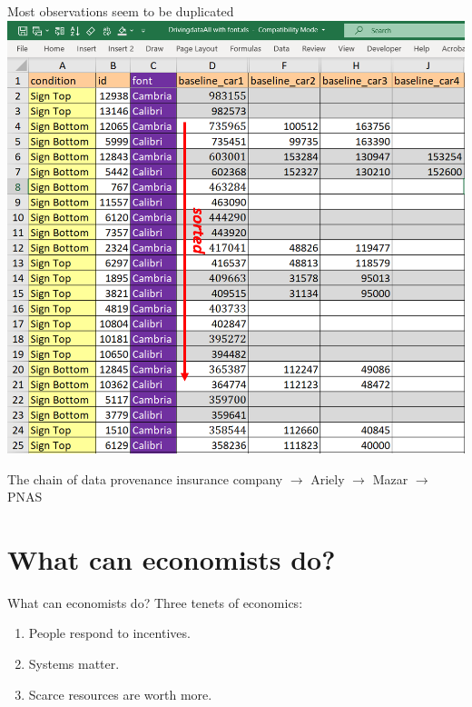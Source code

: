 \documentclass[
  ignorenonframetext,
  aspectratio=1610,
]{beamer}
\providecommand{\tightlist}{%
  \setlength{\itemsep}{0pt}\setlength{\parskip}{0pt}}
\begin{document}
\begin{frame}{Most observations seem to be duplicated}
\protect\hypertarget{most-observations-seem-to-be-duplicated}{}
\includegraphics{exhibit/3-sort-by-car-4-2021-07-07.png}
\end{frame}

\begin{frame}{The chain of data provenance}
\protect\hypertarget{the-chain-of-data-provenance}{}
insurance company \(\to\) Ariely \(\to\) Mazar \(\to\) PNAS
\end{frame}

\hypertarget{what-can-economists-do}{%
\section{What can economists do?}\label{what-can-economists-do}}

\begin{frame}{What can economists do?}
\protect\hypertarget{what-can-economists-do-1}{}
Three tenets of economics:

\begin{enumerate}
\tightlist
\item
  People respond to incentives.
\item
  Systems matter.
\item
  Scarce resources are worth more.
\end{enumerate}
\end{frame}
\end{document}
